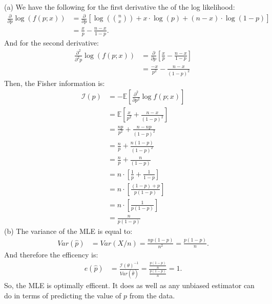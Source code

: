 (a) We have the following for the first derivative the of the log likelihood:
\begin{align*}
\frac{\partial}{\partial p} \log(f(p; x))
&= \frac{\partial}{\partial p} \left[ \log(\binom{n}{x}) +  x \cdot \log(p) + (n-x) \cdot \log(1-p) \right] \\
&= \frac{x}{p} - \frac{n-x}{1-p}.
\end{align*}
And for the second derivative:
\begin{align*}
\frac{\partial^2}{\partial^2 p} \log(f(p; x))
&= \frac{\partial}{\partial p} \left[ \frac{x}{p} - \frac{n-x}{1-p} \right] \\
&= \frac{-x}{p^2} - \frac{n-x}{(1-p)^2}
\end{align*}
Then, the Fisher information is:
\begin{align*}
\mathcal{I}(p) &= - \mathbb{E} \left[ \frac{\partial^2}{\partial p^2} \log f(p; x) \right] \\
&= \mathbb{E} \left[ \frac{x}{p^2} + \frac{n-x}{(1-p)^2} \right] \\
&= \frac{np}{p^2} + \frac{n-np}{(1-p)^2} \\
&= \frac{n}{p} + \frac{n(1-p)}{(1-p)^2} \\
&= \frac{n}{p} + \frac{n}{(1-p)} \\
&= n \cdot \left[ \frac{1}{p} + \frac{1}{1-p} \right] \\
&= n \cdot \left[ \frac{(1 - p) + p}{p (1 - p)} \right] \\
&= n \cdot \left[ \frac{1}{p (1 - p)} \right] \\
&= \frac{n}{p (1 - p)}
\end{align*}
(b) The variance of the MLE is equal to:
\begin{align*}
Var(\hat{p}) &= Var(X/n) = \frac{np(1-p)}{n^2} = \frac{p(1-p)}{n}.
\end{align*}
And therefore the efficency is:
\begin{align*}
e(\hat{p}) &= \frac{\mathcal{I}(\theta)^{-1}}{Var(\widehat{\theta})} = \frac{\frac{p (1 - p)}{n}}{\frac{p(1-p)}{n}} = 1.
\end{align*}
So, the MLE is optimally efficent. It does as well as any unbiased estimator can do in
terms of predicting the value of $p$ from the data.






